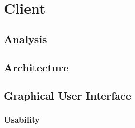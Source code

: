 \section{Client}
\label{Design_Client}

\subsection{Analysis}
\label{Design_Client_Analysis}

\subsection{Architecture}
\label{Design_Client_Architecture}

\subsection{Graphical User Interface}
\label{Design_Client_GUI}

\subsubsection{Usability}
\label{Design_Client_GUI_Usability}